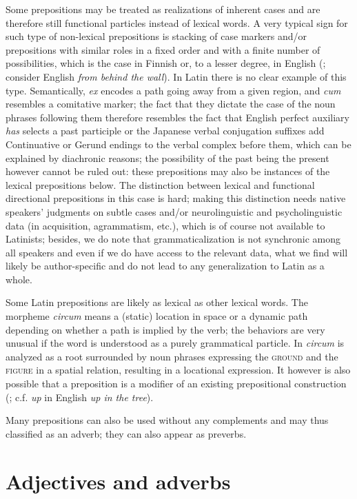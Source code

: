 \documentclass[a4paper, oneside, 12pt]{report}
\newcommand{\form}[1]{\emph{#1}}
\newcommand*{\category}[1]{\textsc{#1}}
\begin{document}
Some prepositions may be treated as realizations of inherent cases
and are therefore still functional particles instead of lexical words.
A very typical sign for such type of non-lexical prepositions is 
stacking of case markers and/or prepositions with similar roles in a fixed order 
and with a finite number of possibilities, 
which is the case in Finnish or, to a lesser degree, in English 
(\citealt{spatialpp}; consider English \form{from behind the wall}).
In Latin there is no clear example of this type.
Semantically, \form{ex} encodes a path going away from a given region, 
and \form{cum} resembles a comitative marker; 
the fact that they dictate the case of the noun phrases following them 
therefore resembles the fact that English perfect auxiliary \form{has} selects a past participle 
or the Japanese verbal conjugation suffixes add Continuative or Gerund endings to the verbal complex before them,
which can be explained by diachronic reasons; 
the possibility of the past being the present however cannot be ruled out:
these prepositions may also be instances of the lexical prepositions below. 
The distinction between lexical and functional directional prepositions in this case is hard;
making this distinction needs native speakers' judgments on subtle cases 
and/or neurolinguistic and psycholinguistic data 
(in acquisition, agrammatism, etc.),
which is of course not available to Latinists;
besides, we do note that grammaticalization is not synchronic among all speakers 
and even if we do have access to the relevant data,
what we find will likely be author-specific and do not lead to any generalization to Latin as a whole.

Some Latin prepositions are likely as lexical as other lexical words.
The morpheme \form{circum} means a (static) location in space or a dynamic path 
depending on whether a path is implied by the verb;
the behaviors are very unusual if the word is understood as a purely grammatical particle.
In \citet{mare2018issues} \form{circum} is analyzed as
a root surrounded by noun phrases expressing the \category{ground} and the \category{figure} 
in a spatial relation,
resulting in a locational expression.
It however is also possible that a preposition is a modifier of an existing prepositional construction
(\citealt{botwinik2008greek}; c.f. \form{up} in English \form{up in the tree}).

Many prepositions can also be used without any complements 
and may thus classified as an adverb; 
they can also appear as preverbs.


\section{Adjectives and adverbs}
\end{document}
